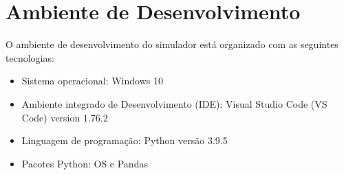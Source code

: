 
\section{Ambiente de Desenvolvimento}

O ambiente de desenvolvimento do simulador está organizado com as seguintes tecnologias:

\begin{itemize}
    \item Sistema operacional: Windows 10
    \item Ambiente integrado de Desenvolvimento (IDE): Visual Studio Code (VS Code) version 1.76.2
    \item Linguagem de programação: Python versão 3.9.5
    \item Pacotes Python: OS e Pandas
\end{itemize}
